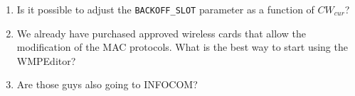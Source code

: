 \begin{enumerate}
 \item Is it possible to adjust the \texttt{BACKOFF\_SLOT} parameter as a function of $CW_{cur}$?
 \item We already have purchased approved wireless cards that allow the modification of the MAC protocols. What is the best way to start using the WMPEditor?
 \item Are those guys also going to INFOCOM?
\end{enumerate}


% 
% 
% 
% 

